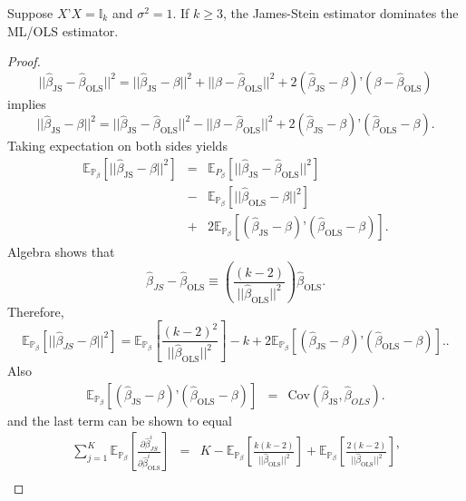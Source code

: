 \documentclass[11pt]{article} %
\begin{document}
\begin{proposition}
Suppose $X’X = \mathbb{I}_{k}$ and $\sigma^2=1$. If $k \geq 3$, the James-Stein estimator dominates the ML/OLS estimator. 
\end{proposition}
\begin{proof}
\[ || \widehat{\beta}_{\textrm{JS}} - \widehat{\beta}_{\textrm{OLS}} ||^2  = || \widehat{\beta}_{\textrm{JS}} - \beta ||^2 + || \beta -\widehat{\beta}_{\textrm{OLS}} ||^2 + 2 ( \widehat{\beta}_{\textrm{JS}} - \beta  )’ (\beta -\widehat{\beta}_{\textrm{OLS}}) \]
implies
\[|| \widehat{\beta}_{\textrm{JS}} - \beta ||^2 = || \widehat{\beta}_{\textrm{JS}} - \widehat{\beta}_{\textrm{OLS}} ||^2 - || \beta -\widehat{\beta}_{\textrm{OLS}} ||^2 + 2 ( \widehat{\beta}_{\textrm{JS}} - \beta  )’ (\widehat{\beta}_{\textrm{OLS}}- \beta). \]
Taking expectation on both sides yields
\begin{eqnarray*} 
\mathbb{E}_{\mathbb{P}_{\beta}} \left[ || \widehat{\beta}_{\textrm{JS}} - \beta ||^2 \right] & = & \mathbb{E}_{P_{\beta}} \left[  || \widehat{\beta}_{\textrm{JS}} - \widehat{\beta}_{\textrm{OLS}}||^2 \right] \\
&-& \mathbb{E}_{\mathbb{P}_{\beta}} \left[ || \widehat{\beta}_{\textrm{OLS}}- \beta ||^2 \right] \\
&+& 2 \mathbb{E}_{\mathbb{P}_{\beta}} \left[ (\widehat{\beta}_{\textrm{JS}} -\beta)’( \widehat{\beta}_{\textrm{OLS}}- \beta)  \right].
\end{eqnarray*}
Algebra shows that 
\[\widehat{\beta}_{JS} - \widehat{\beta}_{\textrm{OLS}} \equiv \left(  \frac{(k-2)}{||\widehat{\beta}_{\textrm{OLS}} ||^2} \right) \widehat{\beta}_{\textrm{OLS}}. \]
Therefore,
\[  \mathbb{E}_{\mathbb{P}_{\beta}} \left[ ||\widehat{\beta}_{JS} -\beta ||^2 \right] =  \mathbb{E}_{\mathbb{P}_{\beta}}  \left[ \frac{(k-2)^2}{|| \widehat{\beta}_{\textrm{OLS}} ||^2} \right] - k + 2 \mathbb{E}_{\mathbb{P}_{\beta}} \left[ (\widehat{\beta}_{\textrm{JS}} -\beta)’( \widehat{\beta}_{\textrm{OLS}}- \beta)  \right]. . \]
Also
\begin{eqnarray*}
\mathbb{E}_{\mathbb{P}_{\beta}} \left[ (\widehat{\beta}_{\textrm{JS}} - \beta)’( \widehat{\beta}_{\textrm{OLS}}- \beta)  \right] &=& \textrm{Cov}( \widehat{\beta}_{\textrm{JS}},\widehat{\beta}_{OLS} ). 
\end{eqnarray*}
and the last term can be shown to equal
\begin{eqnarray*}
\sum_{j=1}^{K} \mathbb{E}_{\mathbb{P}_{\beta}} \left[ \frac{\partial \widehat{\beta}^i_{JS} }{\partial \widehat{\beta}^i_{\textrm{OLS}}} \right] &=& K - \mathbb{E}_{\mathbb{P}_{\beta}} \left[ \frac{k  (k-2)}{||\widehat{\beta}_{\textrm{OLS}} ||^2} \right] + \mathbb{E}_{\mathbb{P}_{\beta}} \left[ \frac{2(k-2)}{||\widehat{\beta}_{\textrm{OLS}} ||^2} \right]’ \\

\end{eqnarray*}
\end{proof}
\end{document}
